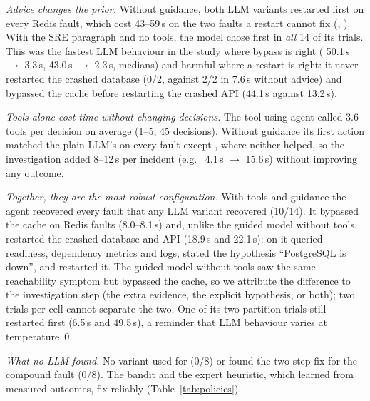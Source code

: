 \emph{Advice changes the prior.} Without guidance, both LLM variants restarted first on every Redis fault,
which cost 43--59\,s on the two faults a restart cannot fix (, ).
With the SRE paragraph and no tools, the model chose  first in \emph{all} 14 of its
trials. This was the fastest LLM behaviour in the study where bypass is right (
50.1\,s $\rightarrow$ 3.3\,s,  43.0\,s $\rightarrow$ 2.3\,s, medians) and harmful
where a restart is right: it never restarted the crashed database (0/2, against 2/2 in 7.6\,s without
advice) and bypassed the cache before restarting the crashed API (44.1\,s against 13.2\,s).

\emph{Tools alone cost time without changing decisions.} The tool-using agent called 3.6 tools per
decision on average (1--5, 45 decisions). Without guidance its first action matched the plain LLM's on
every fault except , where neither helped, so the investigation added 8--12\,s per
incident (e.g.\  4.1\,s $\rightarrow$ 15.6\,s) without improving any outcome.

\emph{Together, they are the most robust configuration.} With tools and guidance the agent recovered
every fault that any LLM variant recovered (10/14). It bypassed the cache on Redis faults (8.0--8.1\,s)
and, unlike the guided model without tools, restarted the crashed database and API (18.9\,s and 22.1\,s):
on  it queried readiness, dependency metrics and logs, stated the hypothesis
``PostgreSQL is down'', and restarted it. The guided model without tools saw the same reachability
symptom but bypassed the cache, so we attribute the difference to the investigation step (the extra
evidence, the explicit hypothesis, or both); two trials per cell cannot separate the two. One of its
two partition trials still restarted first (6.5\,s and 49.5\,s), a reminder that LLM behaviour varies at
temperature~0.

\emph{What no LLM found.} No variant used  for  (0/8) or found the
two-step fix for the compound fault (0/8). The bandit and the expert heuristic, which learned from
measured outcomes, fix  reliably (Table~\ref{tab:policies}).
